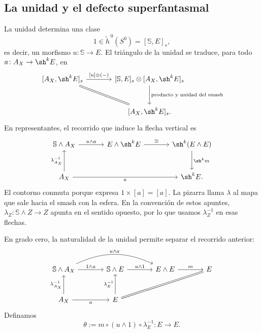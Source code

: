 \subsection{La unidad y el defecto superfantasmal}
La unidad determina una clase
\[
1\in\widetilde h^{\,0}(S^0)=[\mathbb S,E]_s,
\]
es decir, un morfismo $u\colon\mathbb S\to E$. El triángulo de la unidad se traduce, para todo $a\colon A_X\to \sh^kE$, en
\[
\begin{tikzcd}[column sep=large,row sep=large]
{[A_X,\sh^kE]_s}\arrow[r,"{[u]\otimes(-)}"]\arrow[dr,equal]&
{[\mathbb S,E]_s}\otimes{[A_X,\sh^kE]_s}\arrow[d,"\text{producto y unidad del smash}"]\\
&{[A_X,\sh^kE]_s}.
\end{tikzcd}
\]
En representantes, el recorrido que induce la flecha vertical es
\[
\begin{tikzcd}[column sep=large,row sep=large]
\mathbb S\wedge A_X\arrow[r,"u\wedge a"]&E\wedge \sh^kE
 \arrow[r,"\cong"]&\sh^k(E\wedge E)\arrow[d,"\sh^km"]\\
A_X\arrow[u,"\lambda_{A_X}^{-1}"]\arrow[rr,"a"']&&\sh^kE.
\end{tikzcd}
\]
El contorno conmuta porque expresa $1\times[a]=[a]$. La pizarra llama $\lambda$ al mapa que sale hacia el smash con la esfera. En la convención de estos apuntes, $\lambda_Z\colon\mathbb S\wedge Z\to Z$ apunta en el sentido opuesto, por lo que usamos $\lambda_Z^{-1}$ en esas flechas.

En grado cero, la naturalidad de la unidad permite separar el recorrido anterior:
\[
\begin{tikzcd}[column sep=large,row sep=large]
\mathbb S\wedge A_X\arrow[r,"1\wedge a"]\arrow[rr,bend left=25,"u\wedge a"]&
\mathbb S\wedge E\arrow[r,"u\wedge1"]&E\wedge E\arrow[r,"m"]&E\\
A_X\arrow[u,"\lambda_{A_X}^{-1}"]\arrow[r,"a"']&
E\arrow[u,"\lambda_E^{-1}"]\arrow[urr,equal]&&
\end{tikzcd}
\]
Definamos
\[
\theta:=m\circ(u\wedge1)\circ\lambda_E^{-1}\colon E\longrightarrow E.
\]

